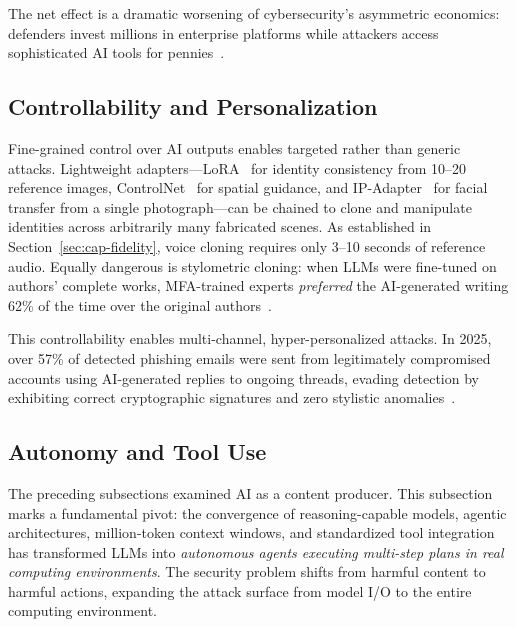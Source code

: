 The net effect is a dramatic worsening of cybersecurity's asymmetric economics: defenders invest millions in enterprise platforms while attackers access sophisticated AI tools for pennies~\cite{zensec2025phishing}.


\subsection{Controllability and Personalization}
\label{sec:cap-control}

Fine-grained control over AI outputs enables targeted rather than generic attacks. Lightweight adapters---LoRA~\cite{hu2022lora} for identity consistency from 10--20 reference images, ControlNet~\cite{zhang2023controlnet} for spatial guidance, and IP-Adapter~\cite{ye2023ipadapter} for facial transfer from a single photograph---can be chained to clone and manipulate identities across arbitrarily many fabricated scenes. As established in Section~\ref{sec:cap-fidelity}, voice cloning requires only 3--10 seconds of reference audio. Equally dangerous is stylometric cloning: when LLMs were fine-tuned on authors' complete works, MFA-trained experts \emph{preferred} the AI-generated writing 62\% of the time over the original authors~\cite{chi2026creative}.

This controllability enables multi-channel, hyper-personalized attacks. In 2025, over 57\% of detected phishing emails were sent from legitimately compromised accounts using AI-generated replies to ongoing threads, evading detection by exhibiting correct cryptographic signatures and zero stylistic anomalies~\cite{zensec2025phishing}.


\subsection{Autonomy and Tool Use}
\label{sec:cap-autonomy}

The preceding subsections examined AI as a content producer. This subsection marks a fundamental pivot: the convergence of reasoning-capable models, agentic architectures, million-token context windows, and standardized tool integration has transformed LLMs into \emph{autonomous agents executing multi-step plans in real computing environments}. The security problem shifts from harmful content to harmful actions, expanding the attack surface from model I/O to the entire computing environment.

